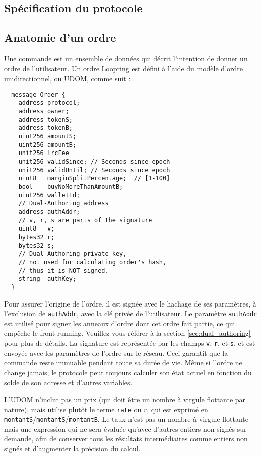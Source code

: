 \documentclass[UTF8,nofonts]{article}
\begin{document}
\begin{multicols}{2}
\section{Spécification du protocole\label{sec:protocol}}

\subsection{Anatomie d'un ordre\label{anatomy}}
Une commande est un ensemble de données qui décrit l'intention de donner un ordre de l'utilisateur. Un ordre Loopring est défini à l'aide du modèle d'ordre unidirectionnel, ou UDOM, comme suit :

\begin{verbatim}
  message Order {
    address protocol;
    address owner;
    address tokenS;
    address tokenB;
    uint256 amountS;
    uint256 amountB;
    unit256 lrcFee
    unit256 validSince; // Seconds since epoch
    unit256 validUntil; // Seconds since epoch
    uint8   marginSplitPercentage;  // [1-100]
    bool    buyNoMoreThanAmountB;
    uint256 walletId;
    // Dual-Authoring address
    address authAddr;
   	// v, r, s are parts of the signature
    uint8   v;       
    bytes32 r;
    bytes32 s;
    // Dual-Authoring private-key,
    // not used for calculating order's hash,
    // thus it is NOT signed.
    string  authKey;          
  }
\end{verbatim}


Pour assurer l'origine de l’ordre, il est signée avec le hachage de ses paramètres, à l'exclusion de \verb|authAddr|, avec la clé privée de l'utilisateur. Le paramètre \verb|authAddr| est utilisé pour signer les anneaux d'ordre dont cet ordre fait partie, ce qui empêche le front-running. Veuillez vous référer à la section \ref{sec:dual_authoring} pour plus de détails. La signature est représentée par les champs \verb|v|, \verb|r|, et \verb|s|, et est envoyée avec les paramètres de l'ordre sur le réseau. Ceci garantit que la commande reste immuable pendant toute sa durée de vie. Même si l'ordre ne change jamais, le protocole peut toujours calculer son état actuel en fonction du solde de son adresse et d'autres variables.



L'UDOM n'inclut pas un prix (qui doit être un nombre à virgule flottante par nature), mais utilise plutôt le terme \verb|rate| ou $r$, qui est exprimé en \verb|montantS|/\verb|montantS|/\verb|montantB|. Le taux n'est pas un nombre à virgule flottante mais une expression qui ne sera évaluée qu'avec d'autres entiers non signés sur demande, afin de conserver tous les résultats intermédiaires comme entiers non signés et d'augmenter la précision du calcul.


\end{multicols}
\end{document}
